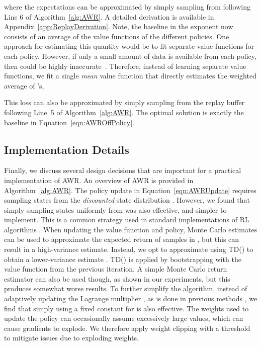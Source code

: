 \documentclass{article} \usepackage{iclr2020_conference,times}
\begin{document}
where the expectations can be approximated by simply sampling from  following Line 6 of Algorithm~\ref{alg:AWR}. A detailed derivation is available in Appendix~\ref{app:ReplayDerivation}. Note, the baseline in the exponent now consists of an average of the value functions of the different policies. One approach for estimating this quantity would be to fit separate value functions  for each policy. However, if only a small amount of data is available from each policy, then  could be highly inaccurate~\citep{fu19diagnosing}. Therefore, instead of learning separate value functions, we fit a single \emph{mean} value function  that directly estimates the weighted average of 's,

This loss can also be approximated by simply sampling from the replay buffer following Line~5 of Algorithm~\ref{alg:AWR}. The optimal solution  is exactly the baseline in Equation~\ref{eqn:AWROffPolicy}.

\subsection{Implementation Details}

Finally, we discuss several design decisions that are important for a practical implementation of AWR. An overview of AWR is provided in Algorithm~\ref{alg:AWR}. The policy update in Equation~\ref{eqn:AWRUpdate} requires sampling states from the \emph{discounted} state distribution . However, we found that simply sampling states uniformly from  was also effective, and simpler to implement. This is a common strategy used in standard implementations of RL algorithms \citep{baselines}. When updating the value function and policy, Monte Carlo estimates can be used to approximate the expected return  of samples in , but this can result in a high-variance estimate. Instead, we opt to approximate  using TD() to obtain a lower-variance estimate \citep{Sutton1998}. TD() is applied by bootstrapping with the value function  from the previous iteration. A simple Monte Carlo return estimator can also be used though, as shown in our experiments, but this produces somewhat worse results.
To further simplify the algorithm, instead of adaptively updating the Lagrange multiplier , as is done in previous methods \citep{Peters2007RWR,Peters2010REP,abdolmaleki2018maximum}, we find that simply using a fixed constant for  is also effective. The weights  used to update the policy can occasionally assume excessively large values, which can cause gradients to explode. We therefore apply weight clipping  with a threshold  to mitigate issues due to exploding weights.
\end{document}
